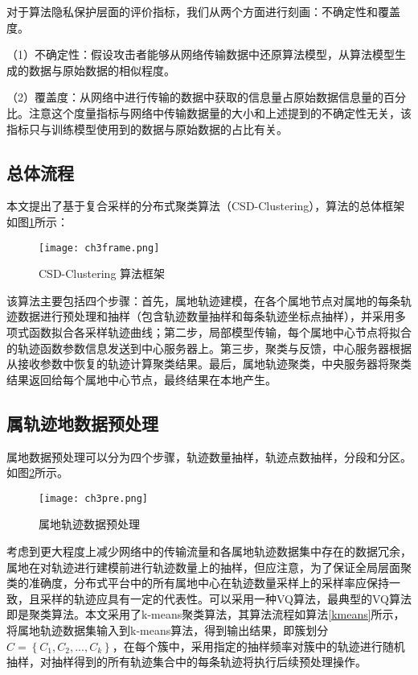 对于算法隐私保护层面的评价指标，我们从两个方面进行刻画：不确定性和覆盖度。

（1）不确定性：假设攻击者能够从网络传输数据中还原算法模型，从算法模型生成的数据与原始数据的相似程度。

（2）覆盖度：从网络中进行传输的数据中获取的信息量占原始数据信息量的百分比。注意这个度量指标与网络中传输数据量的大小和上述提到的不确定性无关，该指标只与训练模型使用到的数据与原始数据的占比有关。

\subsection{总体流程}
本文提出了基于复合采样的分布式聚类算法（CSD-Clustering），算法的总体框架如图\ref{ch3frame}所示：
\begin{figure}[h]
	\texttt{[image: ch3frame.png]}
	\caption{CSD-Clustering 算法框架}
	\label{ch3frame}
\end{figure}

该算法主要包括四个步骤：首先，属地轨迹建模，在各个属地节点对属地的每条轨迹数据进行预处理和抽样（包含轨迹数量抽样和每条轨迹坐标点抽样），并采用多项式函数拟合各采样轨迹曲线；第二步，局部模型传输，每个属地中心节点将拟合的轨迹函数参数信息发送到中心服务器上。第三步，聚类与反馈，中心服务器根据从接收参数中恢复的轨迹计算聚类结果。最后，属地轨迹聚类，中央服务器将聚类结果返回给每个属地中心节点，最终结果在本地产生。 

\subsection{属轨迹地数据预处理}
属地数据预处理可以分为四个步骤，轨迹数量抽样，轨迹点数抽样，分段和分区。如图\ref{ch3pre}所示。
\begin{figure}[H]
	\texttt{[image: ch3pre.png]}
	\caption{属地轨迹数据预处理}
	\label{ch3pre}
\end{figure}

考虑到更大程度上减少网络中的传输流量和各属地轨迹数据集中存在的数据冗余，属地在对轨迹进行建模前进行轨迹数量上的抽样，但应注意，为了保证全局层面聚类的准确度，分布式平台中的所有属地中心在轨迹数量采样上的采样率应保持一致，且采样的轨迹应具有一定的代表性。可以采用一种VQ算法，最典型的VQ算法即是聚类算法。本文采用了k-means聚类算法，其算法流程如算法\ref{kmeans}所示，将属地轨迹数据集输入到k-means算法，得到输出结果，即簇划分$C=\left\{C_1,C_2,...,C_k\right\}$，在每个簇中，采用指定的抽样频率对簇中的轨迹进行随机抽样，对抽样得到的所有轨迹集合中的每条轨迹将执行后续预处理操作。

